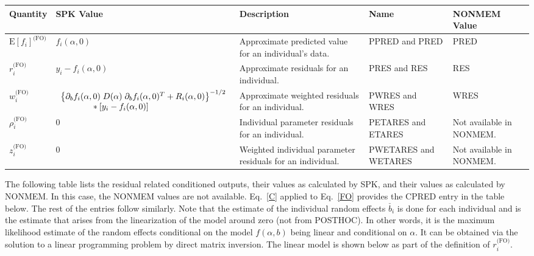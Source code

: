 \documentclass{article}
\begin{document}
\begin{center}
\begin{tabular}{|p{0.75in}|p{3.25in}|p{1.1in}|p{0.85in}|p{1.0in}|}
\hline
\hline
  {\bf Quantity}
    & {\bf SPK Value}
    & {\bf Description}
    & {\bf Name}
    & {\bf NONMEM Value} \\
  \hline
  \hline
  $\mbox{E} \left[ f_i \right]^{\mbox{(FO)}}$
    & $f_i(\alpha, 0)$
    & Approximate predicted value for an individual's data.
    & PPRED and PRED
    & PRED \\
  \hline
  $r^{\mbox{(FO)}}_i$
    & $y_i - f_i(\alpha, 0)$
    & Approximate residuals for an individual.
    & PRES and RES
    & RES \\
  \hline
  $w^{\mbox{(FO)}}_i$
    & $\begin{array}{l}
        \left\{ \partial_b f_i(\alpha, 0) \;
          D(\alpha) \; \partial_b f_i(\alpha, 0)^T
          + R_i(\alpha, 0) \right\}^{-1/2} \\
        \mbox{\hspace{0.5in}}
        \ast [ y_i - f_i(\alpha, 0) ]
      \end{array} $
    & Approximate weighted residuals for an individual.
    & PWRES and WRES
    & WRES \\
  \hline
  $\rho^{\mbox{(FO)}}_i$
    & $0$
    & Individual parameter residuals for an individual.
    & PETARES and ETARES
    & Not available in NONMEM. \\
  \hline
  $z^{\mbox{(FO)}}_i$
    & $0$
    & Weighted individual parameter residuals for an individual.
    & PWETARES and WETARES
    & Not available in NONMEM. \\
  \hline
  \hline
\end{tabular}
\end{center}

The following table lists the residual related conditioned outputs, their
values as calculated by SPK, and their values as calculated by NONMEM.
In this case, the NONMEM values are not available. 
Eq.~\ref{C} applied to Eq.~\ref{FO} provides the CPRED entry in the table
below. The rest of the entries follow similarly.
Note that the estimate of the individual random
effects $\check{b_i}$ is done for each individual and is the estimate
that arises from the linearization of the model around zero (not from
POSTHOC). In other words, it is the maximum likelihood estimate of the
random effects conditional on the model $f(\alpha,b)$ being linear and
conditional on $\alpha$. It 
can be obtained via the solution to a linear programming problem by
direct matrix inversion. The linear model is shown below as part of 
the definition of $r^{\mbox{(FO)}}_i$.
\end{document}
